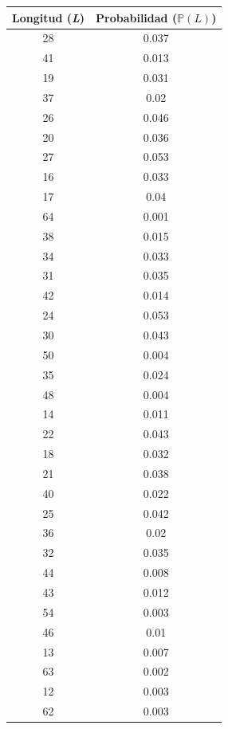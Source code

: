 \documentclass{article}
\begin{document}
\begin{table}[!hbt]
	\begin{center}
	\begin{tabular}{|c|c|}
		\hline
		\rowcolor[gray]{0.9}\textbf{Longitud (\textit{L})} & \textbf{Probabilidad ($\mathbb{P}(\textit{L})$)} \\
		\hline
		28 & 0.037 \\
		\hline
		41 & 0.013 \\
		\hline
		19 & 0.031 \\
		\hline
		37 & 0.02 \\
		\hline
		26 & 0.046 \\
		\hline
		20 & 0.036 \\
		\hline
		27 & 0.053 \\
		\hline
		16 & 0.033 \\
		\hline
		17 & 0.04 \\
		\hline
		64 & 0.001 \\
		\hline
		38 & 0.015 \\
		\hline
		34 & 0.033 \\
		\hline
		31 & 0.035 \\
		\hline
		42 & 0.014 \\
		\hline
		24 & 0.053 \\
		\hline
		30 & 0.043 \\
		\hline
		50 & 0.004 \\
		\hline
		35 & 0.024 \\
		\hline
		48 & 0.004 \\
		\hline
		14 & 0.011 \\
		\hline
		22 & 0.043 \\
		\hline
		18 & 0.032 \\
		\hline
		21 & 0.038 \\
		\hline
		40 & 0.022 \\
		\hline
		25 & 0.042 \\
		\hline
		36 & 0.02 \\
		\hline
		32 & 0.035 \\
		\hline
		44 & 0.008 \\
		\hline
		43 & 0.012 \\
		\hline
		54 & 0.003 \\
		\hline
		46 & 0.01 \\
		\hline
		13 & 0.007 \\
		\hline
		63 & 0.002 \\
		\hline
		12 & 0.003 \\
		\hline
		62 & 0.003 \\

\end{tabular}
\end{center}
\end{table}
\end{document}
